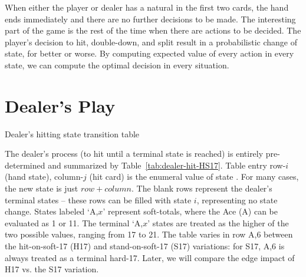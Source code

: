 When either the player or dealer has a natural
in the first two cards, the hand ends immediately
and there are no further decisions to be made.
The interesting part of the game is the rest of the time when
there are actions to be decided.
The player's decision to hit, double-down, and split
result in a probabilistic change of state, for better or worse.
By computing expected value of every action
in every state, we can compute the optimal decision in every situation.  

\section{Dealer's Play}
\label{sec:rules:dealer-play}

\begin{table}[ht!]
\caption{Dealer's hitting state transition table}
\begin{center}

\end{center}
\label{tab:dealer-hit-HS17}
\end{table}

\begin{comment}
\begin{table}[ht!]
\caption{Dealer's hitting state transition table (hits on soft-17)}
\begin{center}

\end{center}
\label{tab:dealer-hit-H17}
\end{table}

\begin{table}[ht!]
\caption{Dealer's hitting state transition table (stands on soft-17)}
\begin{center}

\end{center}
\label{tab:dealer-hit-S17}
\end{table}
\end{comment}

The dealer's process (to hit until a terminal state is reached)
is entirely pre-determined and summarized by Table~\ref{tab:dealer-hit-HS17}.
Table entry row-$i$ (hand state), column-$j$ (hit card) is the enumeral value
of state .  For many cases, the new state is just $row+column$.
The blank rows represent the dealer's terminal states --
these rows can be filled with state $i$, representing no state change.
States labeled `A,$x$' represent soft-totals, where the Ace (A)
can be evaluated as 1 or 11.  
The terminal `A,$x$' states are treated as the higher of the 
two possible values, ranging from 17 to 21.  
The table varies in row A,6 between the hit-on-soft-17 (H17)
and stand-on-soft-17 (S17) variations: for S17, A,6 is always treated
as a terminal hard-17.
Later, we will compare the edge impact of H17 vs. the S17 variation.

